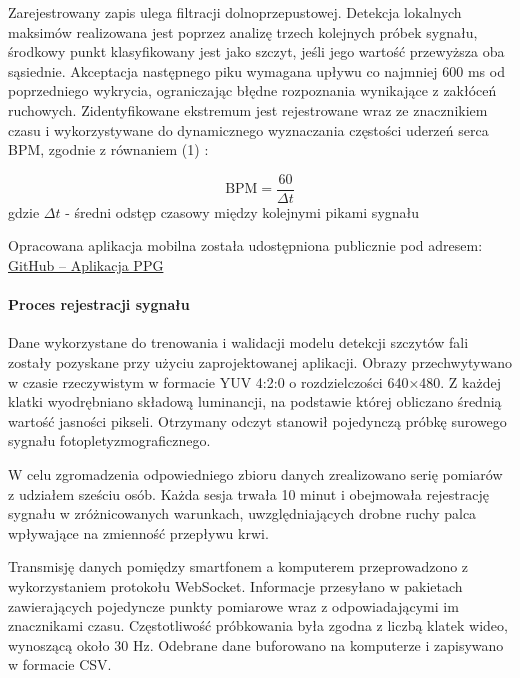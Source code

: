 \documentclass[journal]{IEEEtran}
\begin{document}
{Zarejestrowany zapis ulega filtracji dolnoprzepustowej. Detekcja lokalnych maksimów realizowana jest poprzez analizę trzech kolejnych próbek sygnału, środkowy punkt klasyfikowany jest jako szczyt, jeśli jego wartość przewyższa oba sąsiednie. Akceptacja następnego piku wymagana upływu co najmniej 600 ms od poprzedniego wykrycia, ograniczając błędne rozpoznania wynikające z zakłóceń ruchowych. Zidentyfikowane ekstremum jest rejestrowane wraz ze znacznikiem czasu i wykorzystywane do dynamicznego wyznaczania częstości uderzeń serca BPM, zgodnie z równaniem (1) :

\begin{equation}
\text{BPM} = \frac{60}{\Delta t}
\label{eq:bpm}
\end{equation}
gdzie $\Delta t$  - średni odstęp czasowy między kolejnymi pikami sygnału 

Opracowana aplikacja mobilna została udostępniona publicznie pod adresem:
\href{https://github.com/JanBancerewicz/PPGbetter}{GitHub – Aplikacja PPG}

\newpage
\paragraph{Proces rejestracji sygnału}
Dane wykorzystane do trenowania i walidacji modelu detekcji szczytów fali zostały pozyskane przy użyciu zaprojektowanej aplikacji. Obrazy przechwytywano w czasie rzeczywistym w formacie YUV 4:2:0 o rozdzielczości 640×480. Z każdej klatki wyodrębniano składową luminancji, na podstawie której obliczano średnią wartość jasności pikseli. Otrzymany odczyt stanowił pojedynczą próbkę surowego sygnału fotopletyzmograficznego.

W celu zgromadzenia odpowiedniego zbioru danych zrealizowano serię pomiarów z udziałem sześciu osób. Każda sesja trwała 10 minut i obejmowała rejestrację sygnału w zróżnicowanych warunkach, uwzględniających drobne ruchy palca wpływające na zmienność przepływu krwi.

Transmisję danych pomiędzy smartfonem a komputerem przeprowadzono z wykorzystaniem protokołu WebSocket. Informacje przesyłano w pakietach zawierających pojedyncze punkty pomiarowe wraz z odpowiadającymi im znacznikami czasu. Częstotliwość próbkowania była zgodna z liczbą klatek wideo, wynoszącą około 30 Hz. Odebrane dane buforowano na komputerze i zapisywano w formacie CSV.

}
\end{document}
